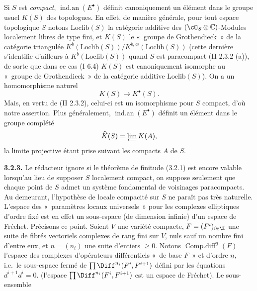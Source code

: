Si $S$ est
\emph{compact}, $\operatorname{ind.an}(E^\bullet)$ définit canoniquement un élément dans le groupe usuel $K(S)$ des topologues. En effet, de manière générale, pour tout espace topologique $S$ notons $\mathrm{Loclib}(S)$ la catégorie additive des $(\cO_S\otimes\mathbb C)$-Modules localement libres de type fini, et $K(S)$ le «~groupe de Grothendieck~» de la catégorie triangulée $K^b(\mathrm{Loclib}(S))/K^{b,\varnothing}(\mathrm{Loclib}(S))$ (cette dernière s'identifie d'ailleurs à $K^b(\mathrm{Loclib}(S))$ quand $S$ est paracompact (II 2.3.2 (a)), de sorte que dans ce cas (I 6.4) $K(S)$ est canoniquement isomorphe au «~groupe de Grothendieck~» de la catégorie additive $\mathrm{Loclib}(S)$). On a un homomorphisme naturel
\[
  K(S)\longrightarrow K^\bullet(S).
\]
Mais, en vertu de (II 2.3.2), celui-ci est un isomorphisme pour $S$ compact, d'où notre assertion. Plus généralement, $\operatorname{ind.an}(E^\bullet)$ définit un élément dans le groupe complété
\[
  \widehat K(S)=\varprojlim K(A),
\]
la limite projective étant prise suivant les compacts $A$ de $S$.

\textbf{3.2.3.} Le rédacteur ignore si le théorème de finitude (3.2.1) est encore valable lorsqu'au lieu de supposer $S$ localement compact, on suppose seulement que chaque point de $S$ admet un système fondamental de voisinages paracompacts. Au demeurant, l'hypothèse de locale compacité sur $S$ ne paraît pas très naturelle. L'espace des «~paramètres locaux universels~» pour les complexes elliptiques d'ordre fixé est en effet un sous-espace (de dimension infinie) d'un espace de Fréchet. Précisons ce point. Soient $V$ une variété compacte, $F=(F^i)_{i\in\Z}$ une suite de fibrés vectoriels complexes de rang fini sur $V$, nuls sauf un nombre fini d'entre eux, et $\underline n=(n_i)$ une suite d'entiers $\geq 0$. Notons $\operatorname{Comp.diff}^{\underline n}(F)$ l'espace des complexes d'opérateurs différentiels «~de base $F$~» et d'ordre $\underline n$, i.e.\ le sous-espace fermé de $\prod\Diff^{n_i}(F^i,F^{i+1})$ défini par les équations $d^{i+1}d^i=0$. (l'espace $\prod\Diff^{n_i}(F^i,F^{i+1})$ est un espace de Fréchet). Le sous-ensemble 
